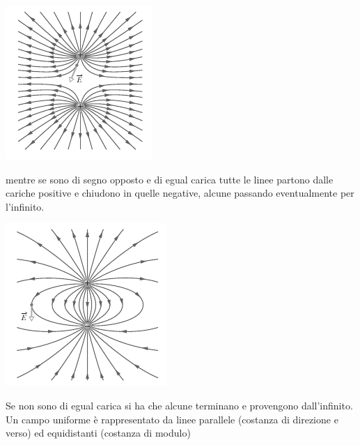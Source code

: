 \documentclass[a4paper,12pt, oneside]{book}
\begin{document}
\begin{center}
	\includegraphics[scale=0.7]{img/ele2.png}
\end{center}
mentre se sono di segno opposto e di egual carica tutte le linee partono dalle cariche positive e chiudono in quelle negative, alcune passando eventualmente per l'infinito.
\begin{center}
	\includegraphics[scale=0.7]{img/ele3.png}
\end{center}
Se non sono di egual carica si ha che alcune terminano e provengono dall'infinito.\\
Un campo uniforme è rappresentato da linee parallele (costanza di direzione e verso) ed equidistanti (costanza di modulo)
\newpage
\end{document}
